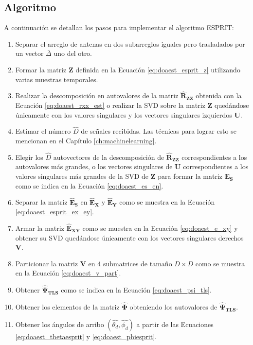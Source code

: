 \subsection{Algoritmo}\label{subc:doaest_esprit_alg}
A continuación se detallan los pasos para implementar el algoritmo ESPRIT:
\begin{enumerate}
    \item Separar el arreglo de antenas en dos subarreglos iguales pero trasladados por un vector $\bar{\Delta}$ uno del otro.
    \item Formar la matriz $\mathbf{Z}$ definida en la Ecuación \ref{eq:doaest_esprit_z} utilizando varias muestras temporales.
    \item Realizar la descomposición en autovalores de la matriz $\mathbf{\hat{R}_{ZZ}}$ obtenida con la Ecuación \ref{eq:doaest_rxx_est} o realizar la SVD sobre la matriz $\mathbf{Z}$ quedándose únicamente con los valores singulares y los vectores singulares izquierdos $\mathbf{U}$.
    \item Estimar el número $\hat{D}$ de señales recibidas. Las técnicas para lograr esto se mencionan en el Capítulo \ref{ch:machinelearning}.
    \item Elegir los $\hat{D}$ autovectores de la descomposición de $\mathbf{\hat{R}_{ZZ}}$ correspondientes a los autovalores más grandes, o los vectores singulares de $\mathbf{U}$ correspondientes a los valores singulares más grandes de la SVD de $\mathbf{Z}$ para formar la matriz $\mathbf{\hat{E}_S}$ como se indica en la Ecuación \ref{eq:doaest_es_en}.
    \item Separar la matriz $\mathbf{\hat{E}_S}$ en $\mathbf{\hat{E}_X}$ y $\mathbf{\hat{E}_Y}$ como se muestra en la Ecuación \ref{eq:doaest_esprit_ex_ey}.
    \item Armar la matriz $\mathbf{\hat{E}_{XY}}$ como se muestra en la Ecuación \ref{eq:doaest_e_xy} y obtener su SVD quedándose únicamente con los vectores singulares derechos $\mathbf{V}$.
    \item Particionar la matriz $\mathbf{V}$ en 4 submatrices de tamaño $D\times D$ como se muestra en la Ecuación \ref{eq:doaest_v_part}.
    \item Obtener $\mathbf{\hat{\Psi}_{TLS}}$ como se indica en la Ecuación \ref{eq:doaest_psi_tls}.
    \item Obtener los elementos de la matriz $\mathbf{\hat{\Phi}}$ obteniendo los autovalores de $\mathbf{\hat{\Psi}_{TLS}}$.
    \item Obtener los ángulos de arribo $(\hat{\theta_d},\hat{\phi_d})$ a partir de las Ecuaciones \ref{eq:doaest_thetaesprit} y \ref{eq:doaest_phiesprit}.
\end{enumerate}

